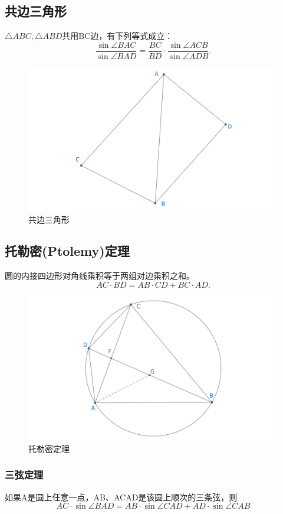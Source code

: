 \subsection{共边三角形}
\begin{proposition}
    $\triangle ABC,\triangle ABD$共用BC边，有下列等式成立：
    $$
    \frac{\sin\angle BAC}{\sin\angle BAD} = \frac{BC}{BD}\cdot \frac{\sin\angle ACB}{\sin\angle ADB}.
    $$
\end{proposition}
\begin{figure}[ht]
    \centering
    \includegraphics[width=0.7\linewidth]{figures/共边三角形.png}
    \caption{共边三角形}
\end{figure}



\newpage 
\subsection{托勒密(Ptolemy)定理}
\begin{theorem}[托勒密定理]
    圆的内接四边形对角线乘积等于两组对边乘积之和。
    $$AC \cdot BD = AB \cdot CD + BC \cdot AD.$$
\end{theorem}
\begin{figure}[ht]
    \centering
    \includegraphics[width=0.7\linewidth]{figures/托勒密定理.png}
    \caption{托勒密定理}
\end{figure}

\subsubsection{三弦定理}
\begin{theorem}[三弦定理]
    如果A是圆上任意一点，AB、ACAD是该圆上顺次的三条弦，则
    $$
    AC\cdot \sin \angle BAD = AB\cdot \sin \angle CAD+AD\cdot \sin \angle CAB
    $$
\end{theorem}

